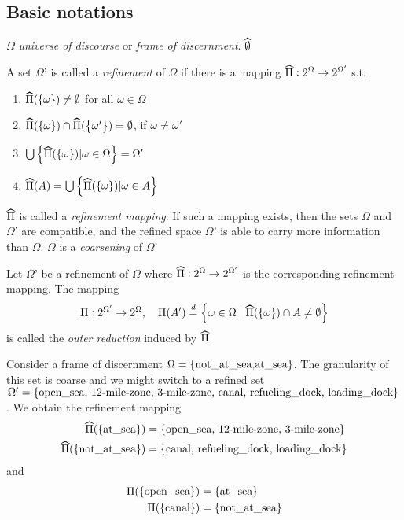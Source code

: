 \documentclass[11pt]{article}
\begin{document}
\subsection{Basic notations}
\label{sec:org8d64b34}
\(\Omega\) \emph{universe of discourse} or \emph{frame of discernment}.
\(\what{\emptyset}\)
\begin{definition}[]
A set \(\Omega\)' is called a \emph{refinement} of \(\Omega\) if there is a mapping 
\(\what{\Pi}:2^\Omega\to 2^{\Omega'}\) s.t.
\begin{enumerate}
\item \(\what{\Pi}(\lb\omega\rb)\neq\emptyset\) for all \(\omega\in\Omega\)
\item \(\what{\Pi}(\lb\omega\rb)\cap\what{\Pi}(\lb\omega'\rb)=\emptyset\), if
\(\omega\neq\omega'\)
\item \(\bigcup\lb\what{\Pi}(\lb\omega\rb)|\omega\in\Omega\rb=\Omega'\)
\item \(\what{\Pi}(A)=\bigcup\lb\what{\Pi}(\lb\omega\rb)|\omega\in A\rb\)
\end{enumerate}
\end{definition}
\(\what{\Pi}\) is called a \emph{refinement mapping}. If such a mapping exists, then
the sets \(\Omega\) and \(\Omega\)' are compatible, and the refined space \(\Omega\)' is
able to carry more information than \(\Omega\). \(\Omega\) is a \emph{coarsening} of \(\Omega\)'

\begin{definition}[]
Let \(\Omega\)' be a refinement of \(\Omega\) where \(\what{\Pi}:2^\Omega\to
   2^{\Omega'}\) is the corresponding refinement mapping. The mapping
\begin{equation*}
\Pi:2^{\Omega'}\to 2^\Omega,\quad\Pi(A')\stackrel{d}{=}\lb
\omega\in\Omega\mid\what{\Pi}(\lb\omega\rb)\cap A\neq\emptyset\rb
\end{equation*}
is called the \emph{outer reduction} induced by \(\what{\Pi}\)
\end{definition}

Consider a frame of discernment \(\Omega=\left\{\text{not\_at\_sea,at\_sea}\right\}\).
The granularity of this set is coarse and we might switch to a refined set
\(\Omega'=\left\{\text{open\_sea, 12-mile-zone, 3-mile-zone, canal, refueling\_dock,
   loading\_dock}\right\}\). We obtain the refinement mapping
\begin{align*}
\what{\Pi}(\lb\text{at\_sea}\rb)&=\lb\text{open\_sea, 12-mile-zone, 3-mile-zone}
\rb\\
\what{\Pi}(\lb\text{not\_at\_sea}\rb)&=\lb
\text{canal, refueling\_dock, loading\_dock}\rb
\end{align*}
and 
\begin{align*}
\Pi(\left\{\text{open\_sea}\right\})&=\left\{\text{at\_sea}\right\}\\
\Pi(\left\{\text{canal}\right\})&=\left\{\text{not\_at\_sea}\right\}\\
\end{align*}
\end{document}
